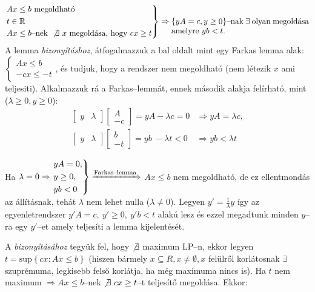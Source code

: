 \[
\begin{rcases}
Ax \leq b \mbox{ megoldható} \\
t \in \mathbb{R} \\
Ax \leq b \mbox{--nek } \not \exists~x \mbox{ megoldása, hogy } cx \geq t
\end{rcases} \Rightarrow
\parbox[t]{6cm}{
$\{yA=c, y \geq 0\}$--nak $\exists$ olyan megoldása amelyre  $yb < t$.}
\] A lemma \emph{bizonyításhoz}, átfogalmazzuk a bal oldalt mint egy Farkas
lemma alak:
$\begin{cases} Ax \leq b \\
-cx \leq -t \end{cases}$, és tudjuk, hogy a rendszer nem megoldható (nem
létezik $x$ ami teljesiti). Alkalmazzuk rá a Farkas--lemmát, ennek második
alakja felírható, mint ($\lambda \geq 0, y
\geq 0$):
\begin{align*}
\begin{bmatrix} y & \lambda\end{bmatrix}
\begin{bmatrix} A \\ -c \end{bmatrix} = yA - \lambda c = 0 &\Rightarrow 
yA = \lambda c, \\
\begin{bmatrix} y & \lambda\end{bmatrix}
\begin{bmatrix} b \\ -t \end{bmatrix} =yb~ - \lambda t < 0 &\Rightarrow 
yb < \lambda t
\end{align*}

Ha $\lambda=0 \Rightarrow \begin{rcases}
yA = 0, \\
y \geq 0, \\
yb <  0 \end{rcases} \xRightarrow{\text{Farkas--lemma}}$ $Ax \leq b$ nem
megoldható, de ez ellentmondás az állításnak, tehát $\lambda$ nem lehet nulla
($\lambda \neq 0$). Legyen $y'=\frac{1}{\lambda}y$ így az egyenletrendszer
$y'A=c,~y'\geq0,~y'b<t$ alakú lesz és ezzel megadtunk minden $y$--ra egy
$y'$--et amely teljesíti a lemma kijelentését.

A  \emph{bizonyításához} tegyük fel, hogy $\not \exists$ maximum
LP--n, ekkor legyen $t=\mbox{sup}\left\{cx:Ax \leq b \right\}$ (hiszen bármely
$x \subseteq R, x \neq \emptyset, x$ felülről korlátosnak $\exists$ szuprémuma,
legkisebb felső korlátja, ha még maximuma nincs is). Ha $t$ nem maximum
$\Rightarrow Ax \leq b$--nek $\not \exists~cx \geq t$--t teljesítő megoldása.
Ekkor:

